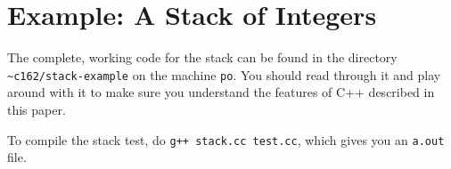 \section{Example: A Stack of Integers}

The complete, working code for the stack can be found in the directory
{\tt {\verb^~^}c162/stack-example} on the machine {\tt po}.  You should
read through it and play around with it to make sure you understand
the features of C++ described in this paper.

To compile the stack test, do {\tt g++ stack.cc test.cc}, which gives
you an {\tt a.out} file.



